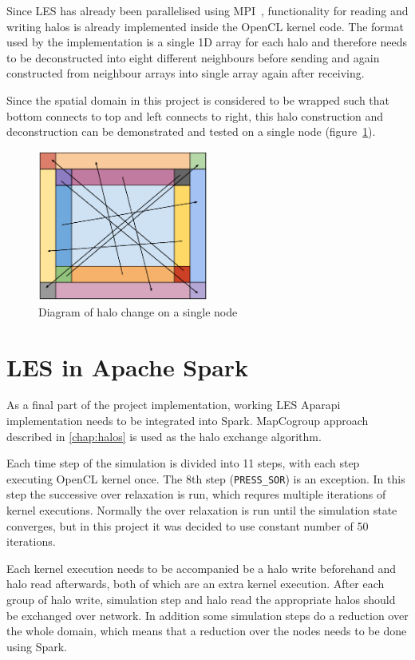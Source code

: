 \documentclass{l4proj}
\begin{document}
Since LES has already been parallelised using MPI~\cite{les_mpi}, functionality 
for reading and writing halos is already implemented inside the OpenCL kernel code.
The format used by the implementation is a single 1D array for each halo and 
therefore needs to be deconstructed into eight different neighbours before sending and 
again constructed from neighbour arrays into single array again after receiving.

Since the spatial domain in this project is considered to be wrapped such that
bottom connects to top and left connects to right, this halo construction and 
deconstruction can be demonstrated and tested on a single node (figure~\ref{fig:halo_exchange}).

\begin{figure}
\centering
\includegraphics[width=0.5\textwidth]{images/Neighbour_exchange_2.eps}
\caption{Diagram of halo change on a single node}
\label{fig:halo_exchange}
\end{figure}

\section{LES in Apache Spark}

As a final part of the project implementation, working LES Aparapi implementation
needs to be integrated into Spark. MapCogroup approach described in \autoref{chap:halos}
is used as the halo exchange algorithm.

Each time step of the simulation is divided into 11 steps, with each step executing
OpenCL kernel once. The 8th step (\texttt{PRESS\_SOR}) is an exception. 
In this step the successive over relaxation is run, which requres multiple 
iterations of kernel executions. Normally the over relaxation is run until 
the simulation state converges, but in this project it was decided to use constant
number of 50 iterations.

Each kernel execution needs to be accompanied be a halo write beforehand 
and halo read afterwards, both of which are an extra kernel execution.
After each group of halo write, simulation step and halo read the appropriate halos
should be exchanged over network. In addition some simulation steps do a reduction over 
the whole domain, which means that a reduction over the nodes needs to be done using Spark.
\end{document}
